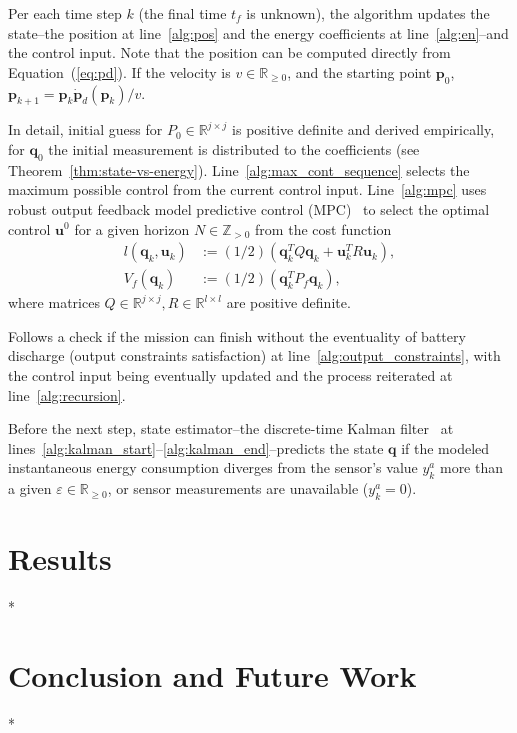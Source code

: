 \documentclass[letterpaper,10pt,conference]{ieeeconf}
\theoremstyle{definition}
\begin{document}
Per each time step $k$ (the final time $t_f$ is unknown), the algorithm updates the state--the position at line~\ref{alg:pos} and the energy coefficients at line~\ref{alg:en}--and the control input. Note that the position can be computed directly from Equation~(\ref{eq:pd}). If the velocity is $v\in\mathbb{R}_{\geq 0}$, and the starting point $\mathbf{p}_0$, $\mathbf{p}_{k+1}=\mathbf{p}_k\dot{\mathbf{p}}_d(\mathbf{p}_k)/v$.
  
In detail, initial guess for $P_0\in\mathbb{R}^{j\times j}$ is positive definite and derived empirically, for $\mathbf{q}_0$ the initial measurement is distributed to the coefficients (see Theorem~\ref{thm:state-vs-energy}). Line~\ref{alg:max_cont_sequence} selects the maximum possible control from the current control input. Line~\ref{alg:mpc} uses robust output feedback model predictive control (MPC)~\cite{rawlings2017model} to select the optimal control $\mathbf{u}^0$ for a given horizon $N\in\mathbb{Z}_{>0}$ from the cost function
\begin{equation}\begin{split}
  l(\mathbf{q}_k,\mathbf{u}_k)&:=(1/2)(\mathbf{q}_k^TQ\mathbf{q}_k+\mathbf{u}_k^TR\mathbf{u}_k),\\
  V_f(\mathbf{q}_k)&:=(1/2)(\mathbf{q}_k^TP_f\mathbf{q}_k),
\end{split}\end{equation}
where matrices $Q\in\mathbb{R}^{j\times j},R\in\mathbb{R}^{l\times l}$ are positive definite.

Follows a check if the mission can finish without the eventuality of battery discharge (output constraints satisfaction) at line~\ref{alg:output_constraints}, with the control input being eventually updated and the process reiterated at line~\ref{alg:recursion}.

Before the next step, state estimator--the discrete-time Kalman filter~\cite{simon2006optimal} at lines~\ref{alg:kalman_start}--\ref{alg:kalman_end}--predicts the state $\mathbf{q}$ if the modeled instantaneous energy consumption diverges from the sensor's value $y_k^a$ more than a given $\varepsilon\in\mathbb{R}_{\geq  0}$, or sensor measurements are unavailable ($y_k^a=0$).


\section{Results}
\label{sec:experimental}

*

\section{Conclusion and Future Work}
\label{sec:conclusion}

*


 
\vspace{0.1ex}

\newpage
\end{document}
